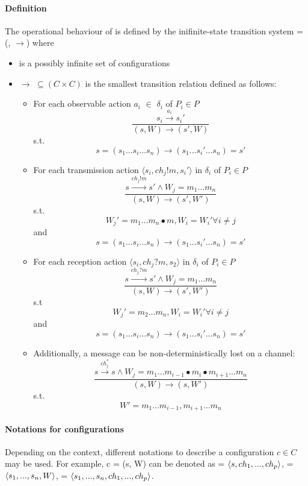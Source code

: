\paragraph{Definition}
\label{CTS}
The operational behaviour of  is defined by the inifinite-state transition system  = (, $\rightarrow$) where
\begin{itemize}
\item[]
    is a possibly infinite set of configurations
\item[]
  $\rightarrow$ $\subseteq (C \times C)$  is the smallest transition relation defined as follows:
  \begin{itemize}
    \item For each observable action $a_i$ $\in$ $\delta_i$ of $P_i \in P$
      $$\dfrac{s_i \xrightarrow{a_i} s_i'}{(s, W) \rightarrow (s', W)}$$
      s.t.
      $$s = (s_1...s_i...s_n) \rightarrow (s_1...s_i'...s_n) = s'$$
    \item For each transmission action $\langle s_i, ch_j!m, s_i' \rangle$ in $\delta_i$ of $P_i \in P$
      $$\dfrac{s \xrightarrow{ch_j!m} s' \wedge W_j = m_1...m_n}{(s, W) \rightarrow (s', W')}$$
      s.t.
      $$W_j' = m_1...m_n \bullet m, W_i = W_i' \forall i \neq j$$ and $$s = (s_1...s_i...s_n) \rightarrow (s_1...s_i'...s_n) = s'$$
    \item For each reception action $\langle s_i, ch_j?m, s_2 \rangle$ in $\delta_i$ of $P_i \in P$
      $$\dfrac{s \xrightarrow{ch_j?m} s' \wedge W_j = m_1...m_n}{(s, W) \rightarrow (s', W')}$$
      s.t
      $$W_j' = m_2...m_n, W_i = W_i' \forall i \neq j$$ and $$s = (s_1...s_i...s_n) \rightarrow (s_1...s_i'...s_n) = s'$$
    \item
      Additionally, a message can be non-deterministically lost on a channel:
      $$\dfrac{s \xrightarrow{ch_j^*} s \wedge W_j = m_1...m_{i-1} \bullet m_i \bullet m_{i+1}...m_n}{(s, W) \rightarrow (s, W')}$$
      s.t.
      $$W' = m_1...m_{i-1},m_{i+1}...m_n$$
  \end{itemize}
\end{itemize}

\paragraph{Notations for configurations}
Depending on the context, different notations to describe a configuration $c\in C$ may be used. For example, c = (s, W) can be denoted as  = $\langle s, ch_1,...,ch_p\rangle$,  = $\langle s_1,...,s_n, W\rangle$,  = $\langle s_1,...,s_n, ch_1,...,ch_p\rangle$.

